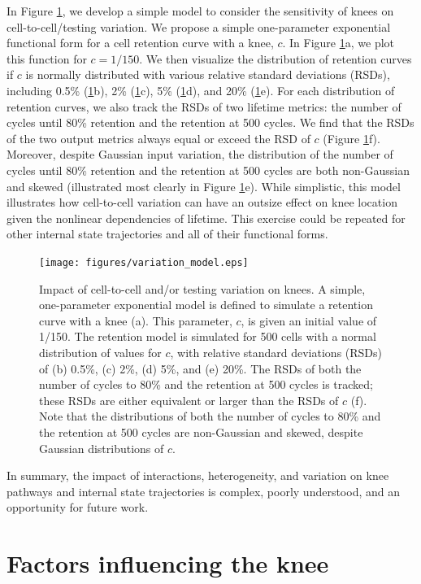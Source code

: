 \documentclass[journal=jpclcd,manuscript=article]{achemso}
\begin{document}
In Figure \ref{fig:var_model}, we develop a simple model to consider the sensitivity of knees on cell-to-cell/testing variation. We propose a simple one-parameter exponential functional form for a cell retention curve with a knee, $c$. In Figure \ref{fig:var_model}a, we plot this function for $c=1/150$. We then visualize the distribution of retention curves if $c$ is normally distributed with various relative standard deviations (RSDs), including 0.5\% (\ref{fig:var_model}b), 2\% (\ref{fig:var_model}c), 5\% (\ref{fig:var_model}d), and 20\% (\ref{fig:var_model}e). For each distribution of retention curves, we also track the RSDs of two lifetime metrics: the number of cycles until 80\% retention and the retention at 500 cycles. We find that the RSDs of the two output metrics always equal or exceed the RSD of $c$ (Figure \ref{fig:var_model}f). Moreover, despite Gaussian input variation, the distribution of the number of cycles until 80\% retention and the retention at 500 cycles are both non-Gaussian and skewed (illustrated most clearly in Figure \ref{fig:var_model}e). While simplistic, this model illustrates how cell-to-cell variation can have an outsize effect on knee location given the nonlinear dependencies of lifetime. This exercise could be repeated for other internal state trajectories and all of their functional forms.

\begin{figure}[ht!]
\centering
\texttt{[image: figures/variation\_model.eps]}
\caption{Impact of cell-to-cell and/or testing variation on knees.
A simple, one-parameter exponential model is defined to simulate a retention curve with a knee (a). This parameter, $c$, is given an initial value of 1/150.
The retention model is simulated for 500 cells with a normal distribution of values for $c$, with relative standard deviations (RSDs) of (b) 0.5\%, (c) 2\%, (d) 5\%, and (e) 20\%. The RSDs of both the number of cycles to 80\% and the retention at 500 cycles is tracked; these RSDs are either equivalent or larger than the RSDs of $c$ (f).
Note that the distributions of both the number of cycles to 80\% and the retention at 500 cycles are non-Gaussian and skewed, despite Gaussian distributions of $c$.}
\label{fig:var_model}
\end{figure}

In summary, the impact of interactions, heterogeneity, and variation on knee pathways and internal state trajectories is complex, poorly understood, and an opportunity for future work.

\section{Factors influencing the knee}
\end{document}
